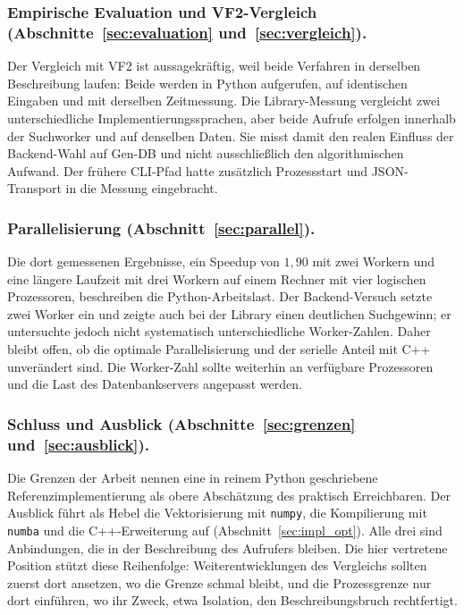 \documentclass[a4paper,12pt, twoside]{report}
\theoremstyle{definition}
\begin{document}
\subsubsection{Empirische Evaluation und VF2-Vergleich (Abschnitte~\ref{sec:evaluation} und~\ref{sec:vergleich}).} Der Vergleich mit VF2 ist aussagekräftig, weil beide Verfahren in derselben Beschreibung laufen: Beide werden in Python aufgerufen, auf identischen Eingaben und mit derselben Zeitmessung. Die Library-Messung vergleicht zwei unterschiedliche Implementierungssprachen, aber beide Aufrufe erfolgen innerhalb der Suchworker und auf denselben Daten. Sie misst damit den realen Einfluss der Backend-Wahl auf Gen-DB und nicht ausschließlich den algorithmischen Aufwand. Der frühere CLI-Pfad hatte zusätzlich Prozessstart und JSON-Transport in die Messung eingebracht.

\subsubsection{Parallelisierung (Abschnitt~\ref{sec:parallel}).} Die dort gemessenen Ergebnisse, ein Speedup von $1{,}90$ mit zwei Workern und eine längere Laufzeit mit drei Workern auf einem Rechner mit vier logischen Prozessoren, beschreiben die Python-Arbeitslast. Der Backend-Versuch setzte zwei Worker ein und zeigte auch bei der Library einen deutlichen Suchgewinn; er untersuchte jedoch nicht systematisch unterschiedliche Worker-Zahlen. Daher bleibt offen, ob die optimale Parallelisierung und der serielle Anteil mit C++ unverändert sind. Die Worker-Zahl sollte weiterhin an verfügbare Prozessoren und die Last des Datenbankservers angepasst werden.

\subsubsection{Schluss und Ausblick (Abschnitte~\ref{sec:grenzen} und~\ref{sec:ausblick}).} Die Grenzen der Arbeit nennen eine in reinem Python geschriebene Referenzimplementierung als obere Abschätzung des praktisch Erreichbaren. Der Ausblick führt als Hebel die Vektorisierung mit \texttt{numpy}, die Kompilierung mit \texttt{numba} und die C++-Erweiterung auf (Abschnitt~\ref{sec:impl_opt}). Alle drei sind Anbindungen, die in der Beschreibung des Aufrufers bleiben. Die hier vertretene Position stützt diese Reihenfolge: Weiterentwicklungen des Vergleichs sollten zuerst dort ansetzen, wo die Grenze schmal bleibt, und die Prozessgrenze nur dort einführen, wo ihr Zweck, etwa Isolation, den Beschreibungsbruch rechtfertigt.
\end{document}
